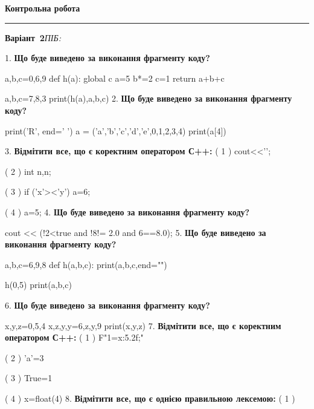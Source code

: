 \documentclass[11pt]{article}
\begin{document}
{%
\newpage

\newpage

{\centering\Large\bfseries Контрольна робота\par}
\medskip
\noindent\rule{\linewidth}{0.5pt}
\smallskip
\noindent\textbf{Варіант \No\,2}\hfill \textit{ПІБ:}\,\underline{\hspace{60mm}}
\vspace{4mm}

1. \textbf{Що буде виведено за виконання фрагменту коду?}

a,b,c=0,6,9
def h(a):
global c    a=5
    b*=2
    c=1
    return a+b+c

a,b,c=7,8,3
print(h(a),a,b,c)
\vspace{5mm}
2. \textbf{Що буде виведено за виконання фрагменту коду?}

print('R', end=' ')
a = ('a','b','c','d','e',0,1,2,3,4)
print(a[4])

\vspace{5mm}
3. %
\textbf{Відмітити все, що є коректним оператором С++:}
( 1 ) cout<<'\n';

( 2 ) int n,n;

( 3 ) if ('x'><'y') a=6;

( 4 ) {a=5;}
\vspace{5mm}
4. \textbf{Що буде виведено за виконання фрагменту коду?}

cout << (!2<true and !8!= 2.0 and 6==8.0);
\vspace{5mm}
5. \textbf{Що буде виведено за виконання фрагменту коду?}

a,b,c=6,9,8
def h(a,b,c):
    print(a,b,c,end="")

h(0,5)
print(a,b,c)

\vspace{5mm}
6. \textbf{Що буде виведено за виконання фрагменту коду?}

x,y,z=0,5,4
x,z,y,y=6,z,y,9
print(x,y,z)
\vspace{5mm}
7. %
\textbf{Відмітити все, що є коректним оператором С++:}
( 1 ) F"1={x:5.2f};"

( 2 ) 'a'=3

( 3 ) True=1

( 4 ) x=float(4)
\vspace{5mm}
8. %
\textbf{Відмітити все, що є однією правильною лексемою:}
( 1 ) {

}}
\end{document}
